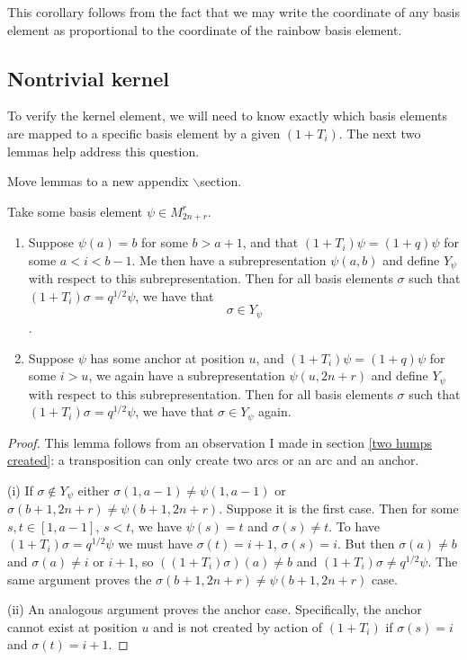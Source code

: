 \documentclass{amsart}
\begin{document}
 This corollary follows from the fact that we may write the coordinate of any basis element as proportional to the coordinate of the rainbow basis element.
 
 
 \subsection{Nontrivial kernel}
 
 
 To verify the kernel element, we will need to know exactly which basis elements are mapped to a specific basis element by a given $(1+T_i)$. The next two lemmas help address this question.
 
 {\color{magenta} Move lemmas to a new appendix $\backslash$section.}
 \begin{lemma}
 	Take some basis element $\psi\in M_{2n+r}^r$. 
 	
 	\begin{enumerate}[label={(\roman*)}]
 		
 		\item Suppose $\psi(a)=b$ for some $b>a+1$, and that $(1+T_i)\psi=(1+q)\psi$ for some $a<i<b-1$. Me then have a subrepresentation $\psi(a,b)$ and define $Y_\psi$ with respect to this subrepresentation. Then for all basis elements $\sigma$ such that $(1+T_i)\sigma=q^{1/2}\psi$, we have that $$\sigma\in Y_\psi$$.
 		
 		\item Suppose $\psi$ has some anchor at position $u$, and $(1+T_i)\psi=(1+q)\psi$ for some $i>u$, we again have a subrepresentation $\psi(u,2n+r)$ and define $Y_\psi$ with respect to this subrepresentation. Then for all basis elements $\sigma$ such that $(1+T_i)\sigma=q^{1/2}\psi$, we have that $\sigma\in Y_\psi$ again.
 		
 		
 	\end{enumerate}
 	\label{preimage under hump}
 \end{lemma}
 
 \begin{proof}
 	This lemma follows from an observation I made in section \ref{two humps created}: a transposition can only create two arcs or an arc and an anchor. 
 	
 	(i) If $\sigma\not\in Y_\psi$ either $\sigma(1,a-1)\not=\psi(1,a-1)$ or $\sigma(b+1,2n+r)\not=\psi(b+1,2n+r)$. Suppose it is the first case. Then for some $s,t\in [1,a-1]$, $s<t$, we have $\psi(s)=t$ and $\sigma(s)\not=t$. To have $(1+T_i)\sigma=q^{1/2}\psi$ we must have $\sigma(t)=i+1$, $\sigma(s)=i$. But then $\sigma(a)\not=b$ and $\sigma(a)\not=i$ or $i+1$, so $((1+T_i)\sigma)(a)\not=b$ and $(1+T_i)\sigma\not=q^{1/2}\psi$. The same argument proves the $\sigma(b+1,2n+r)\not=\psi(b+1,2n+r)$ case. 
 	
 	(ii) An analogous argument proves the anchor case. Specifically, the anchor cannot exist at position $u$ and is not created by action of $(1+T_i)$ if $\sigma(s)=i$ and $\sigma(t)=i+1$.
 	
 \end{proof}
 
\end{document}
